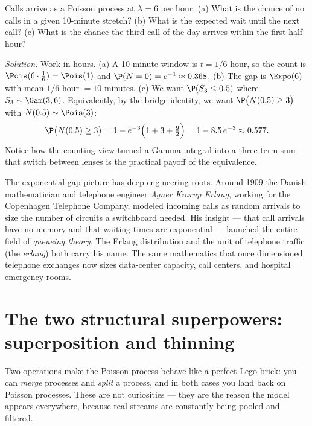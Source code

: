 \begin{example}
\label{ch25:ex-helpdesk}
Calls arrive as a Poisson process at $\lambda = 6$ per hour. (a) What is the
chance of no calls in a given 10-minute stretch? (b) What is the expected wait
until the next call? (c) What is the chance the third call of the day arrives
within the first half hour?

\emph{Solution.} Work in hours. (a) A 10-minute window is $t = 1/6$ hour, so the
count is $\Pois(6 \cdot \tfrac16) = \Pois(1)$ and $\P(N=0) = e^{-1} \approx
0.368$. (b) The gap is $\Expo(6)$ with mean $1/6$ hour $= 10$ minutes. (c) We
want $\P(S_3 \le 0.5)$ where $S_3 \sim \Gam(3,6)$. Equivalently, by the bridge
identity, we want $\P\big(N(0.5) \ge 3\big)$ with $N(0.5) \sim \Pois(3)$:
\[
\P\big(N(0.5)\ge 3\big) = 1 - e^{-3}\Big(1 + 3 + \tfrac{9}{2}\Big)
= 1 - 8.5\,e^{-3} \approx 0.577.
\]
Notice how the counting view turned a Gamma integral into a three-term sum ---
that switch between lenses is the practical payoff of the equivalence.
\end{example}

\begin{historybox}
The exponential-gap picture has deep engineering roots. Around 1909 the Danish
mathematician and telephone engineer \emph{Agner Krarup Erlang}, working for the
Copenhagen Telephone Company, modeled incoming calls as random arrivals to size
the number of circuits a switchboard needed. His insight --- that call arrivals
have no memory and that waiting times are exponential --- launched the entire
field of \emph{queueing theory}. The Erlang distribution and the unit of
telephone traffic (the \emph{erlang}) both carry his name. The same mathematics
that once dimensioned telephone exchanges now sizes data-center capacity, call
centers, and hospital emergency rooms.
\end{historybox}

\section{The two structural superpowers: superposition and thinning}
\label{ch25:super-thin}

Two operations make the Poisson process behave like a perfect Lego brick: you can
\emph{merge} processes and \emph{split} a process, and in both cases you land back
on Poisson processes. These are not curiosities --- they are the reason the model
appears everywhere, because real streams are constantly being pooled and
filtered.

